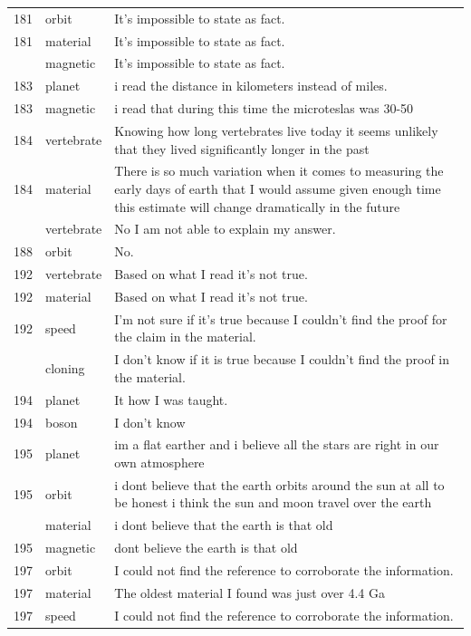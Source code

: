 \documentclass[
  doc,floatsintext]{apa6}
\begin{document}
\begin{longtable}[t]{>{}r>{}l>{\raggedright\arraybackslash}p{30em}}
181 & orbit & It's impossible to state as fact.\\
181 & material & It's impossible to state as fact.\\
\addlinespace
181 & magnetic & It's impossible to state as fact.\\
183 & planet & i read the distance in kilometers instead of miles.\\
183 & magnetic & i read that during this time the microteslas was 30-50\\
184 & vertebrate & Knowing how long vertebrates live today it seems unlikely that they lived significantly longer in the past\\
184 & material & There is so much variation when it comes to measuring the early days of earth that I would assume given enough time this estimate will change dramatically in the future\\
\addlinespace
188 & vertebrate & No I am not able to explain my answer.\\
188 & orbit & No.\\
192 & vertebrate & Based on what I read it’s not true.\\
192 & material & Based on what I read it’s not true.\\
192 & speed & I’m not sure if it’s true because I couldn’t find the proof for the claim in the material.\\
\addlinespace
192 & cloning & I don’t know if it is true because I couldn’t find the proof in the material.\\
194 & planet & It how I was taught.\\
194 & boson & I don't know\\
195 & planet & im a flat earther and i believe all the stars are right in our own atmosphere\\
195 & orbit & i dont believe that the earth orbits around the sun at all to be honest i think the sun and moon travel over the earth\\
\addlinespace
195 & material & i dont believe that the earth is that old\\
195 & magnetic & dont believe the earth is that old\\
197 & orbit & I could not find the reference to corroborate the information.\\
197 & material & The oldest material I found was just over 4.4 Ga\\
197 & speed & I could not find the reference to corroborate the information.\\
\bottomrule
\end{longtable}
\end{document}
